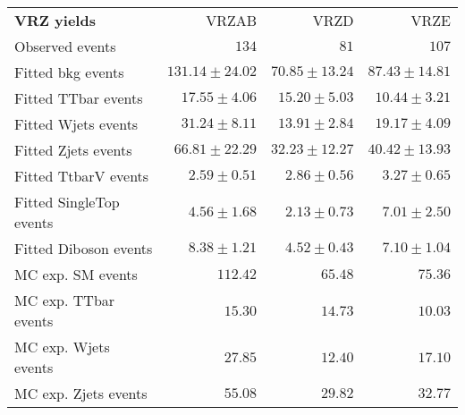 

\begin{table}
\begin{center}
\setlength{\tabcolsep}{0.0pc}
{\small
\begin{tabular*}{\textwidth}{@{\extracolsep{\fill}}lrrr}
\noalign{\smallskip}\hline\noalign{\smallskip}
{\bf VRZ yields}           & VRZAB            & VRZD            & VRZE              \\[-0.05cm]
\noalign{\smallskip}\hline\noalign{\smallskip}
Observed events          & $134$              & $81$              & $107$                    \\
\noalign{\smallskip}\hline\noalign{\smallskip}
Fitted bkg events         & $131.14 \pm 24.02$          & $70.85 \pm 13.24$          & $87.43 \pm 14.81$              \\
\noalign{\smallskip}\hline\noalign{\smallskip}
        Fitted TTbar events         & $17.55 \pm 4.06$          & $15.20 \pm 5.03$          & $10.44 \pm 3.21$              \\
        Fitted Wjets events         & $31.24 \pm 8.11$          & $13.91 \pm 2.84$          & $19.17 \pm 4.09$              \\
        Fitted Zjets events         & $66.81 \pm 22.29$          & $32.23 \pm 12.27$          & $40.42 \pm 13.93$              \\
        Fitted TtbarV events         & $2.59 \pm 0.51$          & $2.86 \pm 0.56$          & $3.27 \pm 0.65$              \\
        Fitted SingleTop events         & $4.56 \pm 1.68$          & $2.13 \pm 0.73$          & $7.01 \pm 2.50$              \\
        Fitted Diboson events         & $8.38 \pm 1.21$          & $4.52 \pm 0.43$          & $7.10 \pm 1.04$              \\
 \noalign{\smallskip}\hline\noalign{\smallskip}
MC exp. SM events              & $112.42$          & $65.48$          & $75.36$              \\
\noalign{\smallskip}\hline\noalign{\smallskip}
        MC exp. TTbar events         & $15.30$          & $14.73$          & $10.03$              \\
        MC exp. Wjets events         & $27.85$          & $12.40$          & $17.10$              \\
        MC exp. Zjets events         & $55.08$          & $29.82$          & $32.77$              \\

\end{tabular*}}
\end{center}
\end{table}
